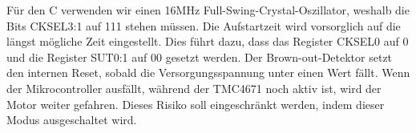 %
Für den \textmu C verwenden wir einen 16MHz Full-Swing-Crystal-Oszillator, weshalb die Bits CKSEL3:1 auf 111 stehen müssen.
Die Aufstartzeit wird vorsorglich auf die längst mögliche Zeit eingestellt. Dies führt dazu, dass das Register CKSEL0 auf 0 und die Register SUT0:1 auf 00 gesetzt werden.
%
%
%
%
%
%
%
%
%
%
%
%
Der Brown-out-Detektor setzt den internen Reset, sobald die Versorgungsspannung unter einen Wert fällt. Wenn der Mikrocontroller ausfällt, während der TMC4671 noch aktiv ist, wird der Motor weiter gefahren. Dieses Risiko soll eingeschränkt werden, indem dieser Modus ausgeschaltet wird.\cite{haftmann_programmierung_nodate}

